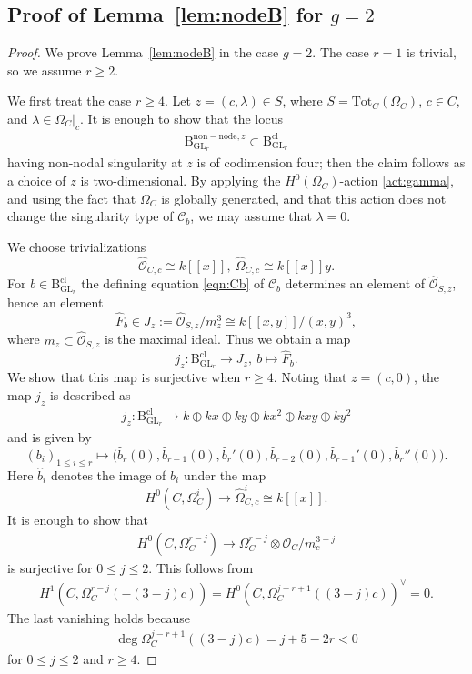 \documentclass[11pt,oneside,a4paper,mathscr]{amsart}
\theoremstyle{definition}
\renewcommand{\leq}{\leqslant}
\renewcommand{\geq}{\geqslant}
\newcommand{\cC}{\mathcal{C}}
\newcommand{\cO}{\mathcal{O}}
\newcommand{\rB}{\mathrm{B}}
\newcommand{\GL}{\operatorname{GL}}
\begin{document}
\subsection[Proof of Lemma 3.17 for g=2]{Proof of Lemma~\ref{lem:nodeB} for \texorpdfstring{$g=2$}{g=2}}\label{subsec:g=2}
\begin{proof}
We prove Lemma~\ref{lem:nodeB} in the case $g=2$. The case $r=1$ is trivial, so we assume 
$r\geq 2$. 

We first treat the case $r\geq 4$. 
Let $z=(c,\lambda)\in S$, where $S=\mathrm{Tot}_C(\Omega_C)$, 
$c\in C$, and $\lambda\in \Omega_C|_c$. 
It is enough to show that the locus 
\begin{align}\label{nonnode:z}
    \rB_{\GL_r}^{\mathrm{non-node}, z} \subset \rB_{\GL_r}^{\mathrm{cl}}
\end{align}
having non-nodal singularity at $z$ is of codimension four; 
then the claim follows as a choice of $z$ is two-dimensional. 
By applying the $H^0(\Omega_C)$-action \eqref{act:gamma}, and using the fact 
that $\Omega_C$ is globally generated, 
and that this action does not change the singularity type of $\cC_b$, 
we may assume that $\lambda=0$. 

We choose trivializations
\[
\widehat{\cO}_{C, c} \cong k[[x]], \ 
    \widehat{\Omega}_{C,c}\cong k[[x]]y.
\]
For $b\in \rB_{\GL_r}^{\mathrm{cl}}$
the defining equation \eqref{eqn:Cb} of $\cC_b$ determines an element of 
$\widehat{\cO}_{S,z}$, hence an element
\[
    \widehat{F}_b \in J_z:=\widehat{\cO}_{S,z}/m_z^3\cong k[[x, y]]/(x, y)^3,
\]
where $m_z\subset \widehat{\cO}_{S,z}$ is the maximal ideal. 
Thus we obtain a map
\[
    j_z \colon \rB_{\GL_r}^{\mathrm{cl}} \to J_z, \ b\mapsto \widehat{F}_b.
\]
We show that this map is surjective when $r\geq 4$. Noting that $z=(c, 0)$, the map $j_z$ is 
described as
\begin{align}\label{surj:jz}
    j_z \colon \rB_{\GL_r}^{\mathrm{cl}}
    \to k\oplus kx\oplus ky\oplus kx^2\oplus kxy\oplus ky^2
\end{align}
and is given by
\[
    (b_i)_{1\leq i\leq r}
    \mapsto
    \bigl(
    \widehat{b}_r(0),
    \widehat{b}_{r-1}(0),
    \widehat{b}_r'(0),
    \widehat{b}_{r-2}(0),
    \widehat{b}_{r-1}'(0),
    \widehat{b}_{r}''(0)
    \bigr).
\]
Here $\widehat{b}_i$ denotes the image of $b_i$ under the map
\[
H^0(C,\Omega_C^i)\to \widehat{\Omega}_{C,c}^i\cong k[[x]].
\]
It is enough to show that
\begin{align}\label{map:Omega}
    H^0(C,\Omega_C^{r-j})
    \to
    \Omega_C^{r-j}\otimes \cO_C/m_c^{3-j}
\end{align}
is surjective for $0\leq j\leq 2$. This follows from
\begin{align}\label{vanish:Omega}
    H^1(C,\Omega_C^{r-j}(-(3-j)c))
    =
    H^0(C,\Omega_C^{j-r+1}((3-j)c))^{\vee}
    =
    0.
\end{align}
The last vanishing holds because
\begin{align}\label{ineq:r}
    \deg \Omega_C^{j-r+1}((3-j)c)=j+5-2r<0
\end{align}
for $0\leq j\leq 2$ and $r\geq 4$. 


\end{proof}
\end{document}

